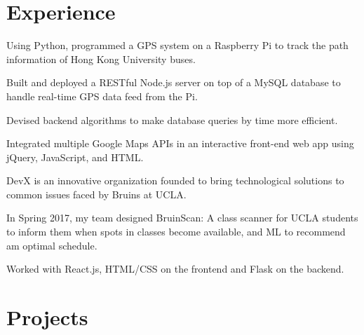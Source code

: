 \documentclass[]{deedy-resume-openfont}
\begin{document}
\hfill
\begin{minipage}[t]{0.66\textwidth}


\section{Experience}

\vspace{\topsep} %
\begin{tightemize}
\item Using Python, programmed a GPS system on a Raspberry Pi to track the path information of Hong Kong University buses.
\item Built and deployed a RESTful Node.js server on top of a MySQL database to handle real-time GPS data feed from the Pi.
\item Devised backend algorithms to make database queries by time more efficient.
 \item Integrated multiple Google Maps APIs in an interactive front-end web app using jQuery, JavaScript, and HTML.
\end{tightemize}
\sectionsep

\begin{tightemize}
\item DevX is an innovative organization founded to bring technological solutions to common issues faced by Bruins at UCLA.
\item In Spring 2017, my team designed BruinScan: A class scanner for UCLA students to inform them when spots in classes become available, and ML to recommend am optimal schedule.
\item Worked with React.js, HTML/CSS on the frontend and Flask on the backend.
\end{tightemize}
\sectionsep


\section{Projects}


\end{minipage}
\end{document}

